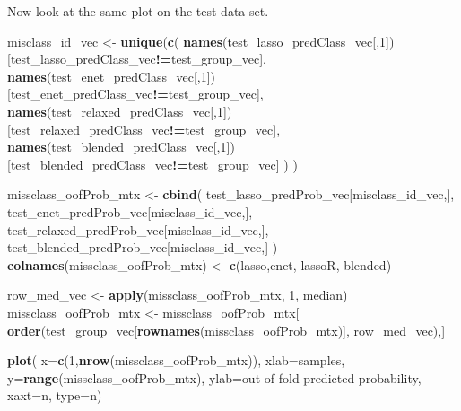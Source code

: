 \documentclass[
]{book}
\newenvironment{Shaded}{\begin{snugshade}}{\end{snugshade}}
\newcommand{\DataTypeTok}[1]{\textcolor[rgb]{0.13,0.29,0.53}{#1}}
\newcommand{\DecValTok}[1]{\textcolor[rgb]{0.00,0.00,0.81}{#1}}
\newcommand{\KeywordTok}[1]{\textcolor[rgb]{0.13,0.29,0.53}{\textbf{#1}}}
\newcommand{\NormalTok}[1]{#1}
\newcommand{\OperatorTok}[1]{\textcolor[rgb]{0.81,0.36,0.00}{\textbf{#1}}}
\newcommand{\StringTok}[1]{\textcolor[rgb]{0.31,0.60,0.02}{#1}}
\begin{document}
Now look at the same plot on the test data set.

\begin{Shaded}
\begin{Highlighting}[]
\NormalTok{misclass\_id\_vec <{-}}\StringTok{ }\KeywordTok{unique}\NormalTok{(}\KeywordTok{c}\NormalTok{(}
 \KeywordTok{names}\NormalTok{(test\_lasso\_predClass\_vec[,}\DecValTok{1}\NormalTok{])[test\_lasso\_predClass\_vec}\OperatorTok{!=}\NormalTok{test\_group\_vec],}
 \KeywordTok{names}\NormalTok{(test\_enet\_predClass\_vec[,}\DecValTok{1}\NormalTok{])[test\_enet\_predClass\_vec}\OperatorTok{!=}\NormalTok{test\_group\_vec],}
 \KeywordTok{names}\NormalTok{(test\_relaxed\_predClass\_vec[,}\DecValTok{1}\NormalTok{])[test\_relaxed\_predClass\_vec}\OperatorTok{!=}\NormalTok{test\_group\_vec],}
 \KeywordTok{names}\NormalTok{(test\_blended\_predClass\_vec[,}\DecValTok{1}\NormalTok{])[test\_blended\_predClass\_vec}\OperatorTok{!=}\NormalTok{test\_group\_vec]}
\NormalTok{ )}
\NormalTok{)}


\NormalTok{missclass\_oofProb\_mtx <{-}}\StringTok{ }\KeywordTok{cbind}\NormalTok{(}
\NormalTok{ test\_lasso\_predProb\_vec[misclass\_id\_vec,],}
\NormalTok{ test\_enet\_predProb\_vec[misclass\_id\_vec,],}
\NormalTok{ test\_relaxed\_predProb\_vec[misclass\_id\_vec,],}
\NormalTok{ test\_blended\_predProb\_vec[misclass\_id\_vec,]}
\NormalTok{)}
\KeywordTok{colnames}\NormalTok{(missclass\_oofProb\_mtx) <{-}}\StringTok{ }\KeywordTok{c}\NormalTok{(}\StringTok{\textquotesingle{}lasso\textquotesingle{}}\NormalTok{,}\StringTok{\textquotesingle{}enet\textquotesingle{}}\NormalTok{, }\StringTok{\textquotesingle{}lassoR\textquotesingle{}}\NormalTok{, }\StringTok{\textquotesingle{}blended\textquotesingle{}}\NormalTok{)}

\NormalTok{row\_med\_vec <{-}}\StringTok{ }\KeywordTok{apply}\NormalTok{(missclass\_oofProb\_mtx, }\DecValTok{1}\NormalTok{, median)}
\NormalTok{missclass\_oofProb\_mtx <{-}}\StringTok{ }\NormalTok{missclass\_oofProb\_mtx[}
  \KeywordTok{order}\NormalTok{(test\_group\_vec[}\KeywordTok{rownames}\NormalTok{(missclass\_oofProb\_mtx)], row\_med\_vec),]}

\KeywordTok{plot}\NormalTok{(}
 \DataTypeTok{x=}\KeywordTok{c}\NormalTok{(}\DecValTok{1}\NormalTok{,}\KeywordTok{nrow}\NormalTok{(missclass\_oofProb\_mtx)), }\DataTypeTok{xlab=}\StringTok{\textquotesingle{}samples\textquotesingle{}}\NormalTok{,}
 \DataTypeTok{y=}\KeywordTok{range}\NormalTok{(missclass\_oofProb\_mtx), }\DataTypeTok{ylab=}\StringTok{\textquotesingle{}out{-}of{-}fold predicted probability\textquotesingle{}}\NormalTok{,}
 \DataTypeTok{xaxt=}\StringTok{\textquotesingle{}n\textquotesingle{}}\NormalTok{, }\DataTypeTok{type=}\StringTok{\textquotesingle{}n\textquotesingle{}}\NormalTok{)}


\end{Highlighting}
\end{Shaded}
\end{document}
